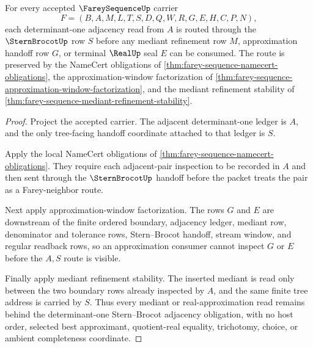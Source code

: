 \begin{theorem}
\label{thm:fareysequence-stern-brocot-adjacency-obligations}
For every accepted $\FareySequenceUp$ carrier
$$
F=(B,A,M,L,T,S,D,Q,W,R,G,E,H,C,P,N),
$$
each determinant-one adjacency read from $A$ is routed through the $\SternBrocotUp$ row $S$ before any mediant refinement row $M$, approximation handoff row $G$, or terminal $\RealUp$ seal $E$ can be consumed. The route is preserved by the NameCert obligations of \autoref{thm:farey-sequence-namecert-obligations}, the approximation-window factorization of \autoref{thm:farey-sequence-approximation-window-factorization}, and the mediant refinement stability of \autoref{thm:farey-sequence-mediant-refinement-stability}.
\end{theorem}
\begin{proof}
Project the accepted carrier. The adjacent determinant-one ledger is $A$, and the only tree-facing handoff coordinate attached to that ledger is $S$.

Apply the local NameCert obligations of \autoref{thm:farey-sequence-namecert-obligations}. They require each adjacent-pair inspection to be recorded in $A$ and then sent through the $\SternBrocotUp$ handoff before the packet treats the pair as a Farey-neighbor route.

Next apply approximation-window factorization. The rows $G$ and $E$ are downstream of the finite ordered boundary, adjacency ledger, mediant row, denominator and tolerance rows, Stern--Brocot handoff, stream window, and regular readback rows, so an approximation consumer cannot inspect $G$ or $E$ before the $A,S$ route is visible.

Finally apply mediant refinement stability. The inserted mediant is read only between the two boundary rows already inspected by $A$, and the same finite tree address is carried by $S$. Thus every mediant or real-approximation read remains behind the determinant-one Stern--Brocot adjacency obligation, with no host order, selected best approximant, quotient-real equality, trichotomy, choice, or ambient completeness coordinate.
\end{proof}

